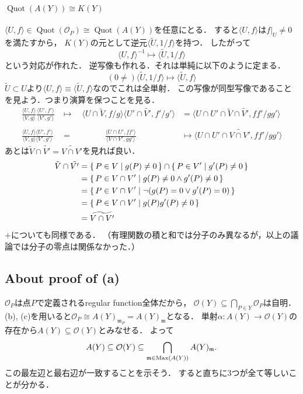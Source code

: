 \documentclass[a4paper]{jarticle}
\newcommand{\I}[1]{\mathfrak{#1}}
\newcommand{\Quot}{\operatorname{Quot}}
\begin{document}
    \paragraph{$\Quot(A(Y)) \cong K(Y)$}
    $\langle U, f \rangle \in \Quot(\mathcal{O}_P) \cong \Quot(A(Y))$を任意にとる．
    すると$\langle U, f \rangle$は$f|_U \neq 0$を満たすから，
    $K(Y)$の元として逆元$\langle \tilde{U}, 1/f \rangle$を持つ．
    したがって
    \[ \langle U, f \rangle^{-1} \mapsto \langle \tilde{U}, 1/f \rangle \]
    という対応が作れた．
    逆写像も作れる．それは単純に以下のように定まる．
    \[ (0 \neq )\langle \tilde{U}, 1/f \rangle \mapsto \langle \tilde{U}, f \rangle \]
    $\tilde{U} \subset U$より$\langle U, f \rangle \equiv \langle \tilde{U}, f \rangle$なのでこれは全単射．
    この写像が同型写像であることを見よう．つまり演算を保つことを見る．
    \begin{align*}
        \frac{\langle U,f \rangle}{\langle V,g \rangle} \frac{\langle U',f' \rangle}{\langle V',g' \rangle}
        &\mapsto \quad
        \langle U \cap \tilde{V},f/g \rangle \langle U' \cap \tilde{V'},f'/g' \rangle
        &=
        \langle U \cap U' \cap \tilde{V} \cap \tilde{V'},ff'/gg' \rangle
        \\ \\
        \frac{\langle U, f \rangle \langle U', f' \rangle}{\langle V, g \rangle \langle V', g' \rangle}
        &= \qquad\qquad
        \frac{\langle U \cap U', ff' \rangle}{\langle V \cap V', gg' \rangle}
        &\mapsto
        \langle U \cap U' \cap \widetilde{V \cap V'}, ff'/gg' \rangle
    \end{align*}
    あとは$\tilde{V} \cap \tilde{V'}=\widetilde{V \cap V'}$を見れば良い．
    \begin{align*}
        \tilde{V} \cap \tilde{V'}
        &=\set{P \in V | g(P) \neq 0} \cap \set{P \in V' | g'(P) \neq 0} \\
        &=\set{P \in V \cap V' | g(P) \neq 0 \land g'(P) \neq 0} \\
        &=\set{P \in V \cap V' | \lnot(g(P)=0 \lor g'(P)=0)} \\
        &=\set{P \in V \cap V' | g(P)g'(P) \neq 0} \\
        &=\widetilde{V \cap V'}
    \end{align*}
    $+$についても同様である．
    （有理関数の積と和では分子のみ異なるが，以上の議論では分子の零点は関係なかった．）

    \subsection{About proof of (a)}
    $\mathcal{O}_P$は点$P$で定義されるregular function全体だから，
    $\mathcal{O}(Y) \subseteq \bigcap_{P \in Y} \mathcal{O}_P$は自明．
    (b), (c)を用いると$\mathcal{O}_P \cong A(Y)_{\I{m}_P} = A(Y)_{\I{m}}$となる．
    単射$\alpha: A(Y) \to \mathcal{O}(Y)$の存在から$A(Y) \subseteq \mathcal{O}(Y)$とみなせる．
    よって
    \[ A(Y) \subseteq \mathcal{O}(Y) \subseteq \bigcap_{\I{m} \in \Max(A(Y))} A(Y)_{\I{m}}. \]
    この最左辺と最右辺が一致することを示そう．
    すると直ちに3つが全て等しいことが分かる．
\end{document}
